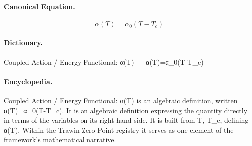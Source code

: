 \paragraph{Canonical Equation.}
\[
\alpha(T)=\alpha_0(T-T_c)
\]

\paragraph{Dictionary.}
Coupled Action / Energy Functional: α(T) — α(T)=α\_0(T-T\_c)

\paragraph{Encyclopedia.}
Coupled Action / Energy Functional: α(T) is an algebraic definition, written α(T)=α\_0(T-T\_c). It is an algebraic definition expressing the quantity directly in terms of the variables on its right-hand side. It is built from T, T\_c, defining α(T). Within the Trawin Zero Point registry it serves as one element of the framework's mathematical narrative.
